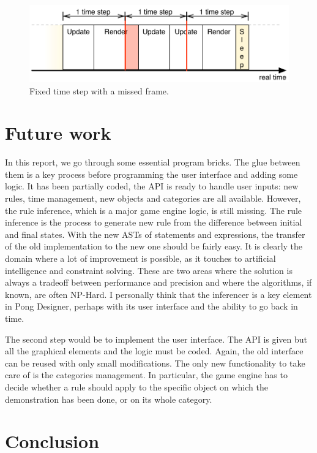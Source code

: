 \documentclass[11pt,a4paper]{article}
\begin{document}
\begin{figure}[h]
\centering
\includegraphics[scale = 0.8]{images/missFrame} 
\caption{Fixed time step with a missed frame.}
\label{fig:missFrame}
\end{figure}

\section{Future work}
In this report, we go through some essential program bricks. The glue between them is a key process before programming the user interface and adding some logic. It has been partially coded, the API is ready to handle user inputs: new rules, time management, new objects and categories are all available. However, the rule inference, which is a major game engine logic, is still missing. The rule inference is the process to generate new rule from the difference between initial and final states. With the new ASTs of statements and expressions, the transfer of the old implementation to the new one should be fairly easy. It is clearly the domain where a lot of improvement is possible, as it touches to artificial intelligence and constraint solving. These are two areas where the solution is always a tradeoff between performance and precision and where the algorithms, if known, are often NP-Hard. I personally think that the inferencer is a key element in Pong Designer, perhaps with its user interface and the ability to go back in time.

The second step would be to implement the user interface. The API is given but all the graphical elements and the logic must be coded. Again, the old interface can be reused with only small modifications. The only new functionality to take care of is the categories management. In particular, the game engine has to decide whether a rule should apply to the specific object on which the demonstration has been done, or on its whole category.

\section{Conclusion}


\nocite{*}


\end{document}
